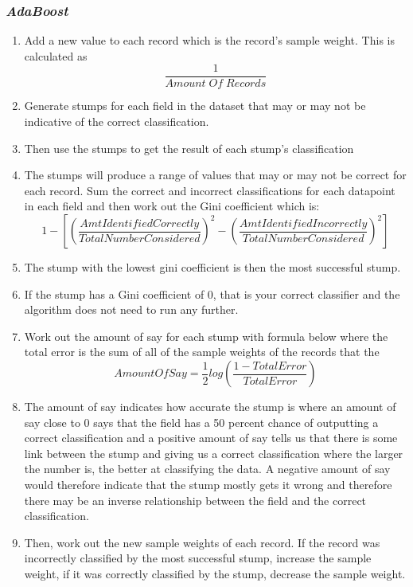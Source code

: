 \documentclass{article}
\begin{document}
\subsubsection{\textit{AdaBoost}}
\begin{enumerate}
    \item {Add a new value to each record which is the record’s sample weight. This is calculated as $$\frac{1}{Amount \; Of \; Records}$$}
    \item {Generate stumps for each field in the dataset that may or may not be indicative of the correct classification.}
    \item Then use the stumps to get the result of each stump’s classification
    \item The stumps will produce a range of values that may or may not be correct for each record. Sum the correct and incorrect classifications for each datapoint in each field and then work out the Gini coefficient which is:
    $$1 - \left[\left(\frac{Amt Identified Correctly}{Total Number Considered}\right)^2 - \left(\frac{Amt Identified Incorrectly}{Total Number Considered}\right)^2\right]$$
    \item The stump with the lowest gini coefficient is then the most successful stump.
    \item If the stump has a Gini coefficient of 0, that is your correct classifier and the algorithm does not need to run any further. 
    \item Work out the amount of say for each stump with formula below where the total error is the sum of all of the sample weights of the records that the $$AmountOfSay = \frac{1}{2} log \left( \frac{1-TotalError}{TotalError} \right)$$
    \item The amount of say indicates how accurate the stump is where an amount of say close to 0 says that the field has a 50 percent chance of outputting a correct classification and a positive amount of say tells us that there is some link between the stump and giving us a correct classification where the larger the number is, the better at classifying the data. A negative amount of say would therefore indicate that the stump mostly gets it wrong and therefore there may be an inverse relationship between the field and the correct classification.
    \item Then, work out the new sample weights of each record. If the record was incorrectly classified by the most successful stump, increase the sample weight, if it was correctly classified by the stump, decrease the sample weight.

\end{enumerate}
\end{document}
